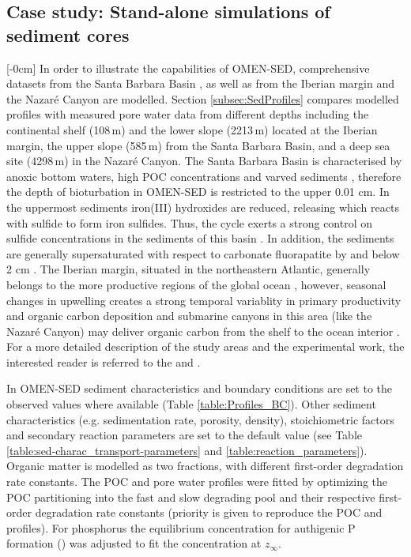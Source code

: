 \documentclass[gmd, manuscript]{copernicus}
\begin{document}
\subsection{Case study: Stand-alone simulations of sediment cores}\label{subsec:SedProfiles_methods}
[-0cm]%
In order to illustrate the capabilities of OMEN-SED, comprehensive datasets from the Santa Barbara Basin \citep{reimers_porewater_1996}, as well as from the Iberian margin and the Nazar\'e Canyon \citep{epping_oxidation_2002} 
are modelled. Section \ref{subsec:SedProfiles} compares modelled profiles with measured pore water data from different depths including the continental shelf (108\,m) and the lower slope (2213\,m) located at the Iberian margin,
the upper slope (585\,m) from the Santa Barbara Basin, and a deep sea site (4298\,m) in the Nazar\'e Canyon. 
The Santa Barbara Basin is characterised by anoxic bottom waters, high POC concentrations and varved sediments \citep{reimers_seasonal_1990}, therefore the depth of bioturbation in OMEN-SED 
is restricted to the upper 0.01 cm. In the uppermost sediments iron(III) hydroxides are reduced, releasing  which reacts with sulfide to form iron sulfides. 
Thus, the  cycle exerts a strong control on sulfide concentrations in the sediments of this basin \citep{reimers_porewater_1996}. 
In addition, the sediments are generally supersaturated with respect to carbonate fluorapatite by and below 2 cm \citep{reimers_porewater_1996}. 
The Iberian margin, situated in the northeastern Atlantic, generally belongs to the more productive regions of the global ocean \citep{longhurst_estimate_1995}, however, seasonal changes in upwelling creates a strong temporal variablity in 
primary productivity and organic carbon deposition and submarine canyons in this area (like the Nazar\'e Canyon) may deliver organic carbon from the shelf to the ocean interior \citep{van_weering_recent_2002, epping_oxidation_2002}.
For a more detailed description of the study areas and the experimental work, the interested reader is referred to the \citet{reimers_porewater_1996} and \citet{epping_oxidation_2002}. 

In OMEN-SED sediment characteristics and boundary conditions are set to the observed values where available (Table \ref{table:Profiles_BC}). Other sediment characteristics (e.g. sedimentation rate, porosity, density), 
stoichiometric factors and secondary reaction parameters are set to the default value (see Table \ref{table:sed-charac_transport-parameters} and \ref{table:reaction_parameters}).
Organic matter is modelled as two fractions, with different first-order degradation rate constants. 
The POC and pore water profiles were fitted by optimizing the POC partitioning into the fast and slow degrading pool and their respective first-order degradation rate constants (priority is given to reproduce the POC 
and  profiles). For phosphorus the equilibrium concentration for authigenic P formation () was adjusted to fit the  concentration at $z_\infty$. 
\end{document}
